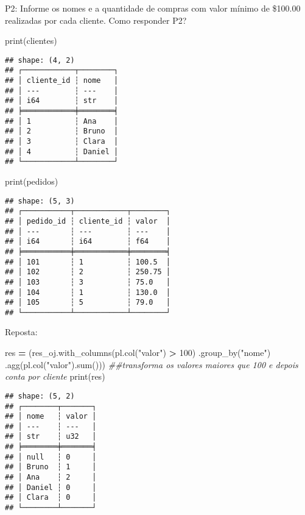 \documentclass[
]{article}
\newenvironment{Shaded}{\begin{snugshade}}{\end{snugshade}}
\newcommand{\BuiltInTok}[1]{#1}
\newcommand{\CommentTok}[1]{\textcolor[rgb]{0.56,0.35,0.01}{\textit{#1}}}
\newcommand{\DecValTok}[1]{\textcolor[rgb]{0.00,0.00,0.81}{#1}}
\newcommand{\NormalTok}[1]{#1}
\newcommand{\OperatorTok}[1]{\textcolor[rgb]{0.81,0.36,0.00}{\textbf{#1}}}
\newcommand{\StringTok}[1]{\textcolor[rgb]{0.31,0.60,0.02}{#1}}
\begin{document}
P2: Informe os nomes e a quantidade de compras com valor mínimo de
\$100.00 realizadas por cada cliente. Como responder P2?

\begin{Shaded}
\begin{Highlighting}[]
\BuiltInTok{print}\NormalTok{(clientes)}
\end{Highlighting}
\end{Shaded}

\begin{verbatim}
## shape: (4, 2)
## ┌────────────┬────────┐
## │ cliente_id ┆ nome   │
## │ ---        ┆ ---    │
## │ i64        ┆ str    │
## ╞════════════╪════════╡
## │ 1          ┆ Ana    │
## │ 2          ┆ Bruno  │
## │ 3          ┆ Clara  │
## │ 4          ┆ Daniel │
## └────────────┴────────┘
\end{verbatim}

\begin{Shaded}
\begin{Highlighting}[]
\BuiltInTok{print}\NormalTok{(pedidos)}
\end{Highlighting}
\end{Shaded}

\begin{verbatim}
## shape: (5, 3)
## ┌───────────┬────────────┬────────┐
## │ pedido_id ┆ cliente_id ┆ valor  │
## │ ---       ┆ ---        ┆ ---    │
## │ i64       ┆ i64        ┆ f64    │
## ╞═══════════╪════════════╪════════╡
## │ 101       ┆ 1          ┆ 100.5  │
## │ 102       ┆ 2          ┆ 250.75 │
## │ 103       ┆ 3          ┆ 75.0   │
## │ 104       ┆ 1          ┆ 130.0  │
## │ 105       ┆ 5          ┆ 79.0   │
## └───────────┴────────────┴────────┘
\end{verbatim}

Reposta:

\begin{Shaded}
\begin{Highlighting}[]
\NormalTok{res }\OperatorTok{=}\NormalTok{ (res\_oj.with\_columns(pl.col(}\StringTok{"valor"}\NormalTok{) }\OperatorTok{\textgreater{}} \DecValTok{100}\NormalTok{)}
\NormalTok{       .group\_by(}\StringTok{"nome"}\NormalTok{)}
\NormalTok{       .agg(pl.col(}\StringTok{"valor"}\NormalTok{).}\BuiltInTok{sum}\NormalTok{())) }\CommentTok{\#\#transforma os valores maiores que 100 e depois conta por cliente}
\BuiltInTok{print}\NormalTok{(res)}
\end{Highlighting}
\end{Shaded}

\begin{verbatim}
## shape: (5, 2)
## ┌────────┬───────┐
## │ nome   ┆ valor │
## │ ---    ┆ ---   │
## │ str    ┆ u32   │
## ╞════════╪═══════╡
## │ null   ┆ 0     │
## │ Bruno  ┆ 1     │
## │ Ana    ┆ 2     │
## │ Daniel ┆ 0     │
## │ Clara  ┆ 0     │
## └────────┴───────┘
\end{verbatim}
\end{document}
